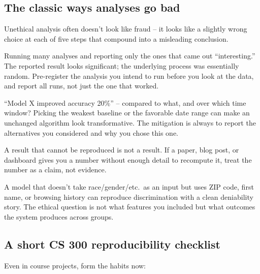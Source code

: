\documentclass[11pt]{article}
\begin{document}
\subsection{The classic ways analyses go bad}

Unethical analysis often doesn't look like fraud -- it looks like a
slightly wrong choice at each of five steps that compound into a
misleading conclusion.

\begin{warnbox}
Running many analyses and reporting only the ones that came out
``interesting.'' The reported result looks significant; the
underlying process was essentially random. Pre-register the analysis
you intend to run before you look at the data, and report all runs,
not just the one that worked.
\end{warnbox}

\begin{warnbox}
``Model X improved accuracy 20\%'' -- compared to what, and over
which time window? Picking the weakest baseline or the favorable
date range can make an unchanged algorithm look transformative. The
mitigation is always to report the alternatives you considered and
why you chose this one.
\end{warnbox}

\begin{warnbox}
A result that cannot be reproduced is not a result. If a paper,
blog post, or dashboard gives you a number without enough detail to
recompute it, treat the number as a claim, not evidence.
\end{warnbox}

\begin{warnbox}
A model that doesn't take race/gender/etc.\ as an input but uses ZIP
code, first name, or browsing history can reproduce discrimination
with a clean deniability story. The ethical question is not what
features you included but what outcomes the system produces across
groups.
\end{warnbox}

\subsection{A short CS 300 reproducibility checklist}

Even in course projects, form the habits now:
\end{document}

